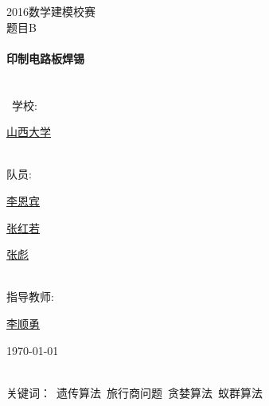 \documentclass[fontset=windows,a4paper,12pt]{ctexart}
\begin{document}
\begin{titlepage} \begin{center} %
  \textsc{\LARGE 2016数学建模校赛}\\
  [1.5cm] \textsc{\Large 题目\quad B}\\
  [0.5cm]\ \\
  [0.4cm] { \huge \bfseries 印制电路板焊锡}\\[0.4cm]\ \\[1.5cm]\ \\[1.4cm]\ 
  \large {学\quad\quad 校:} 
  \begin{minipage}[t]{0.4\textwidth}
    \centering
    \uline{\hspace{3em}山西大学\hfill} \makebox[0.46em]{}\par
  \end{minipage}
  \\[0.6cm]
  \large {队\quad\quad 员:} 
  \begin{minipage}[t]{0.4\textwidth} 
    \uline{\hspace{3em}李恩宾 \hfill} \makebox[0.46em]{}\par
    \uline{\hspace{3em}张红若 \hfill} \makebox[0.46em]{}\par
    \uline{\hspace{3em}张彪\quad \hfill} \makebox[0.46em]{}\par
  \end{minipage}
  \\[0.6cm]
  \large {指导教师:} 
  \begin{minipage}[t]{0.4\textwidth}
    \centering
    \uline{\hspace{3em}李顺勇 \hfill} \makebox[0.46em]{}\par
  \end{minipage}
  \vfill %
  {\large \today} \end{center} \end{titlepage}
  \begin{center}
  \end{center}
  \linespread{1.2}
  \begin{center}
  \end{center}
  \\
  关键词：\ 遗传算法\ 旅行商问题\ 贪婪算法\ 蚁群算法
\end{document}
